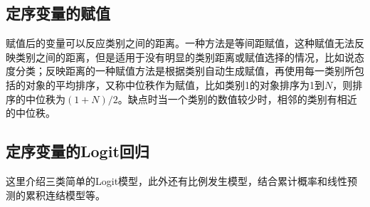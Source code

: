 \documentclass[cn]{elegantpaper}
\begin{document}
\subsection{定序变量的赋值}
赋值后的变量可以反应类别之间的距离。一种方法是等间距赋值，这种赋值无法反映类别之间的距离，但是适用于没有明显的类别距离或赋值选择的情况，比如说态度分类；反映距离的一种赋值方法是根据类别自动生成赋值，再使用每一类别所包括的对象的平均排序，又称中位秩作为赋值，比如类别1的对象排序为1到$N$，则排序的中位秩为$(1+N)/2$。缺点时当一个类别的数值较少时，相邻的类别有相近的中位秩。
\subsection{定序变量的Logit回归}
这里介绍三类简单的Logit模型，此外还有比例发生模型，结合累计概率和线性预测的累积连结模型等。
\end{document}

